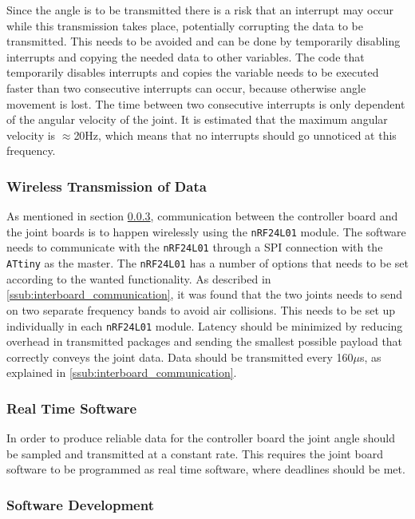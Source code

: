 Since the angle is to be transmitted there is a risk that an interrupt may occur while this transmission takes place, potentially corrupting the data to be transmitted.
This needs to be avoided and can be done by temporarily disabling interrupts and copying the needed data to other variables.
The code that temporarily disables interrupts and copies the variable needs to be executed faster than two consecutive interrupts can occur, because otherwise angle movement is lost.
The time between two consecutive interrupts is only dependent of the angular velocity of the joint.
It is estimated that the maximum angular velocity is  $\approx$20Hz, which means that no interrupts should go unnoticed at this frequency.

\subsubsection{Wireless Transmission of Data}
As mentioned in section \ref{}, communication between the controller board and the joint boards is to happen wirelessly using the \texttt{nRF24L01} module.
The software needs to communicate with the \texttt{nRF24L01} through a SPI connection with the \texttt{ATtiny} as the master.
The \texttt{nRF24L01} has a number of options that needs to be set according to the wanted functionality.
As described in \ref{ssub:interboard_communication}, it was found that the two joints needs to send on two separate frequency bands to avoid air collisions. 
This needs to be set up individually in each \texttt{nRF24L01} module. 
Latency should be minimized by reducing overhead in transmitted packages and sending the smallest possible payload that correctly conveys the joint data.
Data should be transmitted every 160$\mu$s, as explained in \ref{ssub:interboard_communication}. 

\subsubsection{Real Time Software}
In order to produce reliable data for the controller board the joint angle should be sampled and transmitted at a constant rate.
This requires the joint board software to be programmed as real time software, where deadlines should be met.

\subsubsection{Software Development}

